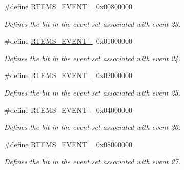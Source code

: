 \begin{DoxyCompactItemize}
\mbox{\label{group__ClassicEventSet_gac7f6bdf6ae2e955276b7af970f6d552b}} 
\#define \mbox{\hyperlink{group__ClassicEventSet_gac7f6bdf6ae2e955276b7af970f6d552b}{R\+T\+E\+M\+S\+\_\+\+E\+V\+E\+N\+T\+\_}}~0x00800000
\begin{DoxyCompactList}\small\item\em Defines the bit in the event set associated with event 23. \end{DoxyCompactList}\item 
\mbox{\label{group__ClassicEventSet_ga7f3be4f18f7e5bddfe1dc2972c0996f7}} 
\#define \mbox{\hyperlink{group__ClassicEventSet_ga7f3be4f18f7e5bddfe1dc2972c0996f7}{R\+T\+E\+M\+S\+\_\+\+E\+V\+E\+N\+T\+\_}}~0x01000000
\begin{DoxyCompactList}\small\item\em Defines the bit in the event set associated with event 24. \end{DoxyCompactList}\item 
\mbox{\label{group__ClassicEventSet_gaf2db84bf8ad82344a8d3737fef086ab8}} 
\#define \mbox{\hyperlink{group__ClassicEventSet_gaf2db84bf8ad82344a8d3737fef086ab8}{R\+T\+E\+M\+S\+\_\+\+E\+V\+E\+N\+T\+\_}}~0x02000000
\begin{DoxyCompactList}\small\item\em Defines the bit in the event set associated with event 25. \end{DoxyCompactList}\item 
\mbox{\label{group__ClassicEventSet_gacdcc0364a5deed139edbf72b04523b7f}} 
\#define \mbox{\hyperlink{group__ClassicEventSet_gacdcc0364a5deed139edbf72b04523b7f}{R\+T\+E\+M\+S\+\_\+\+E\+V\+E\+N\+T\+\_}}~0x04000000
\begin{DoxyCompactList}\small\item\em Defines the bit in the event set associated with event 26. \end{DoxyCompactList}\item 
\mbox{\label{group__ClassicEventSet_ga90031631a4a48c17223e31059be7b495}} 
\#define \mbox{\hyperlink{group__ClassicEventSet_ga90031631a4a48c17223e31059be7b495}{R\+T\+E\+M\+S\+\_\+\+E\+V\+E\+N\+T\+\_}}~0x08000000
\begin{DoxyCompactList}\small\item\em Defines the bit in the event set associated with event 27. \end{DoxyCompactList}\item 

\end{DoxyCompactItemize}
